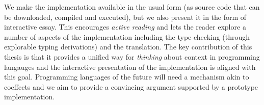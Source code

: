 We make the implementation available in the usual form (as source code that can be downloaded,
compiled and executed), but we also present it in the form of interactive essay. This encourages
\emph{active reading} and lets the reader explore a number of aspects of the implementation
including the type checking (through explorable typing derivations) and the translation. The key
contribution of this thesis is that it provides a unified way for \emph{thinking} about context in
programming langauges and the interactive presentation of the implementation is aligned with this
goal. Programming languages of the future will need a mechanism akin to coeffects and we aim to
provide a convincing argument supported by a prototype implementation.
